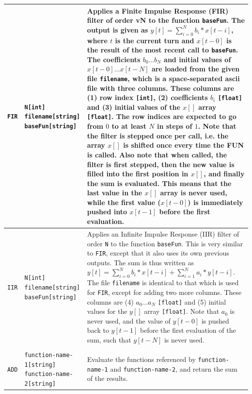 \begin{center}
\begin{longtable}{|p{1.8cm} | p{4.1cm} | p{9.5cm}|}
    \texttt{FIR} & \texttt{N[int] filename[string] baseFun[string]} &
    Applies a Finite Impulse Response (FIR) filter of order v{N} to the function \texttt{baseFun}.
    The output is given as $y[t] = \sum_{i=0}^N b_i*x[t-i]$, where $t$ is the current turn and $x[t-0]$ is the result of the most recent call to \texttt{baseFun}.
    The coefficients $b_0 \ldots b_N$ and initial values of $x[t-0]\ldots x[t-N]$ are loaded from the given file \texttt{filename}, which is a space-separated ascii file with three columns.
    These columns are (1) row index \texttt{[int]}, (2) coefficients $b_i$ \texttt{[float]} and (3) initial values of the $x[]$ array \texttt{[float]}.
    The row indices are expected to go from $0$ to at least $N$ in steps of $1$.
    Note that the filter is stepped once per call, i.e. the array $x[]$ is shifted once every time the FUN is called.
    Also note that when called, the filter is first stepped, then the new value is filled into the first position in $x[]$, and finally the sum is evaluated.
    This means that the last value in the $x[]$ array is never used, while the first value ($x[t-0]$) is immediately pushed into $x[t-1]$ before the first evaluation.\\*
    \hline
    
    \texttt{IIR} & \texttt{N[int] filename[string] baseFun[string]} &
    Applies an Infinite Impulse Response (IIR) filter of order \texttt{N} to the function \texttt{baseFun}.
    This is very similar to \texttt{FIR}, except that it also uses its own previous outputs.
    The sum is thus written as $y[t] = \sum_{i=0}^N b_i*x[t-i] + \sum_{i=1}^N a_i*y[t-i]$.
    The file \texttt{filename} is identical to that which is used for \texttt{FIR}, except for adding two more columns.
    These columns are (4) $a_0\ldots a_N$ \texttt{[float]} and (5) initial values for the $y[]$ array \texttt{[float]}.
    Note that $a_0$ is never used, and the value of $y[t-0]$ is pushed back to $y[t-1]$ before the first evaluation of the sum, such that $y[t-N]$ is never used.\\
    \hline
    
    \rowcolor{blue!15}
    \multicolumn{3}{|l|}{2-operand operators} \\*
    \hline
    
    \texttt{ADD} & \texttt{function-name-1[string] function-name-2[string]} &
    Evaluate the functions referenced by \texttt{function-name-1} and \texttt{function-name-2}, and return the sum of the results.\\*
    \hline


\end{longtable}
\end{center}
